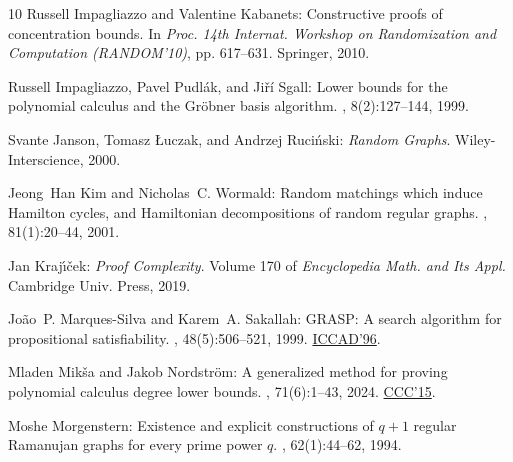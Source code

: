 \documentclass[11pt]{article}
\numberwithin{equation}{section}
\theoremstyle{definition}
\theoremstyle{plain}
\begin{document}
\begin{thebibliography}{10}
{\sc Russell Impagliazzo and Valentine Kabanets}: Constructive proofs of
  concentration bounds.
\newblock In {\em Proc. 14th Internat. Workshop on Randomization and
  Computation (RANDOM'10)}, pp. 617--631. Springer, 2010.
\newblock [\epfmtdoi{10.1007/978-3-642-15369-3\_46}]

{\sc Russell Impagliazzo, Pavel Pudl{\'a}k, and Ji{\v{r}}{\'i} Sgall}: Lower
  bounds for the polynomial calculus and the {G}r{\"o}bner basis algorithm.
, 8(2):127--144, 1999.
\newblock [\epfmtdoi{10.1007/s000370050024}]

{\sc Svante Janson, Tomasz {\L}uczak, and Andrzej Ruci{\'n}ski}: {\em Random
  Graphs}.
\newblock Wiley-Interscience, 2000.
\newblock [\epfmtdoi{10.1002/9781118032718}]

{\sc Jeong~Han Kim and Nicholas~C. Wormald}: Random matchings which induce
  {H}amilton cycles, and {H}amiltonian decompositions of random regular graphs.
, 81(1):20--44, 2001.

{\sc Jan Kraj{\'\i}{\v{c}}ek}: {\em Proof Complexity}.
\newblock Volume 170 of {\em Encyclopedia Math. and Its Appl.}
\newblock Cambridge Univ. Press, 2019.
\newblock [\epfmtdoi{10.1017/9781108242066}]

{\sc Jo{\~a}o~P. {Marques-Silva} and Karem~A. Sakallah}: {GRASP}: A search
  algorithm for propositional satisfiability.
, 48(5):506--521, 1999.
\newblock \prelim \href{https://doi.org/10.1109/ICCAD.1996.569607}{ICCAD'96}.
\newblock [\epfmtdoi{10.1109/12.769433}]

{\sc Mladen Mik\v{s}a and Jakob Nordstr\"om}: A generalized method for proving
  polynomial calculus degree lower bounds.
, 71(6):1--43, 2024.
\newblock \prelim \href{https://doi.org/10.4230/LIPIcs.CCC.2015.467}{CCC'15}.
\newblock [\epfmtdoi{10.1145/3675668}]

{\sc Moshe Morgenstern}: Existence and explicit constructions of $q + 1$
  regular {R}amanujan graphs for every prime power $q$.
, 62(1):44--62, 1994.


\end{thebibliography}
\end{document}
